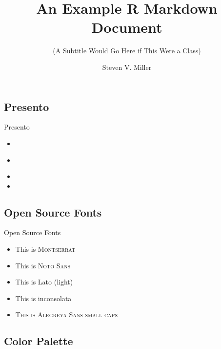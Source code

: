 \documentclass[
  10pt,
  ignorenonframetext,
]{beamer}
\title{An Example R Markdown Document}
\subtitle{(A Subtitle Would Go Here if This Were a Class)}
\author{Steven V. Miller}
\date{}
\institute{Department of Political Science}
\providecommand{\tightlist}{%
  \setlength{\itemsep}{0pt}\setlength{\parskip}{0pt}}
\begin{document}
\frame{\titlepage}

\hypertarget{presento}{%
\subsection{Presento}\label{presento}}

\begin{frame}{Presento}
\begin{itemize}
\item
  \begin{center}\end{center}    \bigskip
\item
  \begin{center}\end{center}   \bigskip
\item
  \item \begin{center}\end{center}
\end{itemize}
\end{frame}

\hypertarget{open-source-fonts}{%
\subsection{Open Source Fonts}\label{open-source-fonts}}

\begin{frame}{Open Source Fonts}
\begin{itemize}
\tightlist
\item
  \montserratfont This is \textsc{Montserrat} \bigskip
\item
  \notosansfont This is \textsc{Noto Sans} \bigskip
\item
  \latolightfont This is Lato (light) \bigskip
\item
  \inconsolatafont This is inconsolata \bigskip
\item
  \textsc{This is Alegreya Sans small caps} \bigskip
\end{itemize}
\end{frame}

\hypertarget{color-palette}{%
\subsection{Color Palette}\label{color-palette}}
\end{document}
